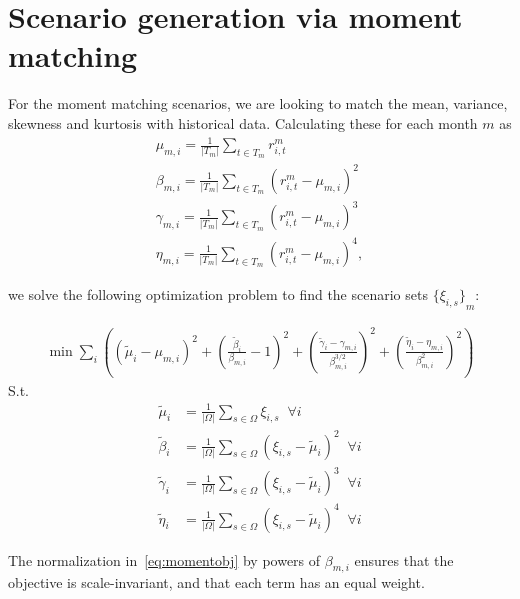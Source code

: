 \section{Scenario generation via moment matching}

For the moment matching scenarios, we are looking to match the mean, variance, skewness and kurtosis with historical data.
Calculating these for each month $m$ as
\begin{gather}
\mu_{m,i} = \frac{1}{|T_m|} \sum_{t \in T_m} r^m_{i,t} \\
\beta_{m,i} = \frac{1}{|T_m|} \sum_{t \in T_m} {\left( r^m_{i,t} - \mu_{m,i} \right)}^2 \\
\gamma_{m,i} = \frac{1}{|T_m|} \sum_{t \in T_m} {\left( r^m_{i,t} - \mu_{m,i} \right)}^3 \\
\eta_{m,i} = \frac{1}{|T_m|} \sum_{t \in T_m} {\left( r^m_{i,t} - \mu_{m,i} \right)}^4 ,
\end{gather}

we solve the following optimization problem to find the scenario sets ${\{\xi_{i,s}\}}_{m}$:

\begin{align}
\min \sum_i \left(
	{(\tilde{\mu}_i - \mu_{m,i})}^2 +
	{\left( \frac{\tilde{\beta}_i}{\beta_{m,i}} - 1 \right)}^2 +
	{\left( \frac{\tilde{\gamma}_i - \gamma_{m,i}}{\beta_{m,i}^{3/2}} \right)}^2 +
	{\left( \frac{\tilde{\eta}_i - \eta_{m,i}}{\beta_{m,i}^{2}} \right)}^2
\right)
\label{eq:momentobj}
\end{align}
S.t.
\begin{align}
\tilde{\mu}_i &= \frac{1}{|\Omega|} \sum_{s \in \Omega} \xi_{i,s} \; \; \forall i \\
\tilde{\beta}_i &= \frac{1}{|\Omega|} \sum_{s \in \Omega} {\left( \xi_{i,s} - \tilde{\mu}_i \right)}^2 \; \; \forall i \\
\tilde{\gamma}_i &= \frac{1}{|\Omega|} \sum_{s \in \Omega} {\left( \xi_{i,s} - \tilde{\mu}_i \right)}^3 \; \; \forall i \\
\tilde{\eta}_i &= \frac{1}{|\Omega|} \sum_{s \in \Omega} {\left( \xi_{i,s} - \tilde{\mu}_i \right)}^4 \; \; \forall i
\end{align}

The normalization in~\eqref{eq:momentobj} by powers of $\beta_{m,i}$ ensures that the objective is scale-invariant, and that each term has an equal weight.
